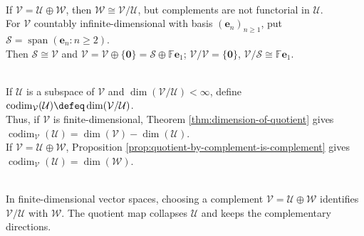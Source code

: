 \begin{perspective} \label{per:quotients-and-complements-are-not-functorial-warnings} \\
If $\mathcal{V}=\mathcal{U}\oplus\mathcal{W}$, then $\mathcal{W}\cong\mathcal{V}/\mathcal{U}$, but complements are not functorial in $\mathcal{U}$.\\
For $\mathcal{V}$ countably infinite-dimensional with basis $(\mathbf{e}_n)_{n\geq1}$, put $\mathcal{S}=\operatorname{span}(\mathbf{e}_n:n\geq2)$.\\
Then $\mathcal{S}\cong\mathcal{V}$ and $\mathcal{V}=\mathcal{V}\oplus\{\mathbf{0}\} =\mathcal{S}\oplus\mathbb{F}\mathbf{e}_1$; $\mathcal{V}/\mathcal{V}=\{\mathbf{0}\}$, $\mathcal{V}/\mathcal{S}\cong\mathbb{F}\mathbf{e}_1$.
\end{perspective}

\begin{definition} \label{def:codimension-subspace} \\
If $\mathcal{U}$ is a subspace of $\mathcal{V}$ and $\dim(\mathcal{V}/\mathcal{U})<\infty$, define $\operatorname{codim}_{\mathcal{V}}(\mathcal{U})\defeq\dim(\mathcal{V}/\mathcal{U})$.\\
Thus, if $\mathcal{V}$ is finite-dimensional, Theorem \ref{thm:dimension-of-quotient} gives $\operatorname{codim}_{\mathcal{V}}(\mathcal{U})=\dim(\mathcal{V})-\dim(\mathcal{U})$.\\
If $\mathcal{V}=\mathcal{U}\oplus\mathcal{W}$, Proposition \ref{prop:quotient-by-complement-is-complement} gives $\operatorname{codim}_{\mathcal{V}}(\mathcal{U})=\dim(\mathcal{W})$.
\end{definition}

\begin{perspective} \label{per:quotients-split-over-fields} \\
In finite-dimensional vector spaces, choosing a complement $\mathcal{V}=\mathcal{U}\oplus\mathcal{W}$ identifies $\mathcal{V}/\mathcal{U}$ with $\mathcal{W}$. The quotient map collapses $\mathcal{U}$ and keeps the complementary directions.
\end{perspective}

